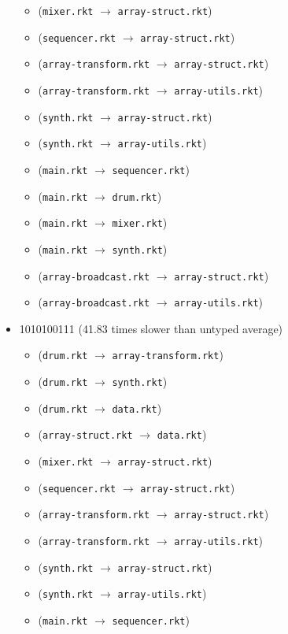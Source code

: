 \documentclass{article}
\newcommand{\mono}[1]{\texttt{#1}}
\begin{document}
\begin{itemize}
\begin{itemize}
  \item (\mono{mixer.rkt} $\rightarrow$ \mono{array-struct.rkt})
  \item (\mono{sequencer.rkt} $\rightarrow$ \mono{array-struct.rkt})
  \item (\mono{array-transform.rkt} $\rightarrow$ \mono{array-struct.rkt})
  \item (\mono{array-transform.rkt} $\rightarrow$ \mono{array-utils.rkt})
  \item (\mono{synth.rkt} $\rightarrow$ \mono{array-struct.rkt})
  \item (\mono{synth.rkt} $\rightarrow$ \mono{array-utils.rkt})
  \item (\mono{main.rkt} $\rightarrow$ \mono{sequencer.rkt})
  \item (\mono{main.rkt} $\rightarrow$ \mono{drum.rkt})
  \item (\mono{main.rkt} $\rightarrow$ \mono{mixer.rkt})
  \item (\mono{main.rkt} $\rightarrow$ \mono{synth.rkt})
  \item (\mono{array-broadcast.rkt} $\rightarrow$ \mono{array-struct.rkt})
  \item (\mono{array-broadcast.rkt} $\rightarrow$ \mono{array-utils.rkt})
  \end{itemize}
\item 1010100111 (41.83 times slower than untyped average)
  \begin{itemize}
  \item (\mono{drum.rkt} $\rightarrow$ \mono{array-transform.rkt})
  \item (\mono{drum.rkt} $\rightarrow$ \mono{synth.rkt})
  \item (\mono{drum.rkt} $\rightarrow$ \mono{data.rkt})
  \item (\mono{array-struct.rkt} $\rightarrow$ \mono{data.rkt})
  \item (\mono{mixer.rkt} $\rightarrow$ \mono{array-struct.rkt})
  \item (\mono{sequencer.rkt} $\rightarrow$ \mono{array-struct.rkt})
  \item (\mono{array-transform.rkt} $\rightarrow$ \mono{array-struct.rkt})
  \item (\mono{array-transform.rkt} $\rightarrow$ \mono{array-utils.rkt})
  \item (\mono{synth.rkt} $\rightarrow$ \mono{array-struct.rkt})
  \item (\mono{synth.rkt} $\rightarrow$ \mono{array-utils.rkt})
  \item (\mono{main.rkt} $\rightarrow$ \mono{sequencer.rkt})

\end{itemize}
\end{itemize}
\end{document}
